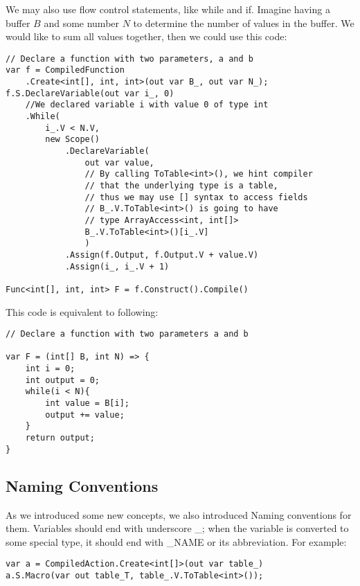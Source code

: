 We may also use flow control statements, like while and if. Imagine having a buffer $B$ and some number $N$ to determine the number of values in the buffer.  We would like to sum all values together, then we could use this code:
\begin{lstlisting}
// Declare a function with two parameters, a and b
var f = CompiledFunction
    .Create<int[], int, int>(out var B_, out var N_);
f.S.DeclareVariable(out var i_, 0)
    //We declared variable i with value 0 of type int
    .While(
        i_.V < N.V, 
        new Scope()
            .DeclareVariable(
                out var value,
                // By calling ToTable<int>(), we hint compiler
                // that the underlying type is a table,
                // thus we may use [] syntax to access fields
                // B_.V.ToTable<int>() is going to have 
                // type ArrayAccess<int, int[]> 
                B_.V.ToTable<int>()[i_.V]
                )
            .Assign(f.Output, f.Output.V + value.V)
            .Assign(i_, i_.V + 1)

Func<int[], int, int> F = f.Construct().Compile()
\end{lstlisting}
This code is equivalent to following:
\begin{lstlisting}
// Declare a function with two parameters a and b

var F = (int[] B, int N) => {
    int i = 0;
    int output = 0;
    while(i < N){
        int value = B[i];
        output += value;
    }
    return output;
}
\end{lstlisting}
\subsection{Naming Conventions}
As we introduced some new concepts, we also introduced Naming conventions for them. Variables should end with underscore \_; when the variable is converted to some special type, it should end with \_NAME or its abbreviation. For example:
\begin{lstlisting}
var a = CompiledAction.Create<int[]>(out var table_)
a.S.Macro(var out table_T, table_.V.ToTable<int>());
\end{lstlisting}


